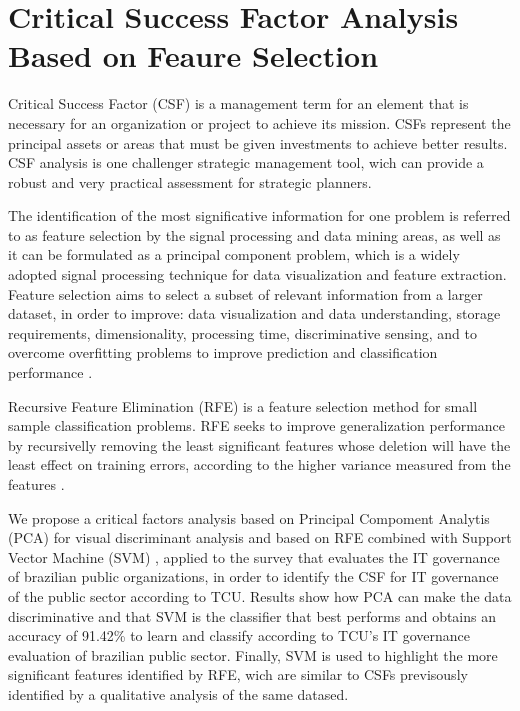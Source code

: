 \chapter{Critical Success Factor Analysis Based on Feaure Selection}
\label{apx:b_csf_fs}


Critical Success Factor (CSF) is a management term for an element that is necessary for an organization or project to achieve its mission. CSFs represent the principal assets or areas that must be given investments to achieve better results. CSF analysis is one challenger strategic management tool, wich can provide a robust and very practical assessment for strategic planners.

The identification of the most significative information for one problem is referred to as feature selection by the signal processing and data mining areas, as well as it can be formulated as a principal component problem, which is a widely adopted signal processing technique for data visualization and feature extraction. Feature selection aims to select a subset of relevant information from a larger dataset, in order to improve: data visualization and data understanding, storage requirements, dimensionality, processing time, discriminative sensing, and to overcome overfitting problems to improve prediction and classification performance \cite{chandrashekar2014survey}.

Recursive Feature Elimination (RFE) is a feature selection method for small sample classification problems. RFE seeks to improve generalization performance by recursivelly removing the least significant features whose deletion will have the least effect on training errors, according to the higher variance measured from the features \cite{chen2007enhanced}.

We propose a critical factors analysis based on Principal Compoment Analytis (PCA) for visual discriminant analysis and based on RFE combined with Support Vector Machine (SVM) \cite{hearst1998support}, applied to the survey that evaluates the IT governance of brazilian public organizations, in order to identify the CSF for IT governance of the public sector according to TCU. Results show how PCA can make the data discriminative and that SVM is the classifier that best performs and obtains an accuracy of 91.42\% to learn and classify according to TCU's IT governance evaluation of brazilian public sector. Finally, SVM is used to highlight the more significant features identified by RFE, wich are similar to CSFs previsously identified by a qualitative analysis of the same datased.

